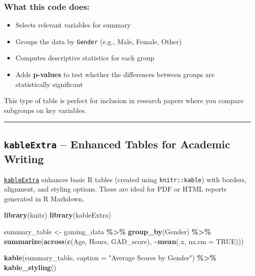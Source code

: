 \documentclass[
]{book}
\newenvironment{Shaded}{\begin{snugshade}}{\end{snugshade}}
\newcommand{\AttributeTok}[1]{\textcolor[rgb]{0.13,0.29,0.53}{#1}}
\newcommand{\ConstantTok}[1]{\textcolor[rgb]{0.56,0.35,0.01}{#1}}
\newcommand{\FunctionTok}[1]{\textcolor[rgb]{0.13,0.29,0.53}{\textbf{#1}}}
\newcommand{\NormalTok}[1]{#1}
\newcommand{\OtherTok}[1]{\textcolor[rgb]{0.56,0.35,0.01}{#1}}
\newcommand{\SpecialCharTok}[1]{\textcolor[rgb]{0.81,0.36,0.00}{\textbf{#1}}}
\newcommand{\StringTok}[1]{\textcolor[rgb]{0.31,0.60,0.02}{#1}}
\providecommand{\tightlist}{%
  \setlength{\itemsep}{0pt}\setlength{\parskip}{0pt}}
\begin{document}
\subsubsection*{What this code does:}\label{what-this-code-does-1}

\begin{itemize}
\tightlist
\item
  Selects relevant variables for summary
\item
  Groups the data by \texttt{Gender} (e.g., Male, Female, Other)
\item
  Computes descriptive statistics for each group
\item
  Adds \textbf{p-values} to test whether the differences between groups are statistically significant
\end{itemize}

This type of table is perfect for inclusion in research papers where you compare subgroups on key variables.

\begin{center}\rule{0.5\linewidth}{0.5pt}\end{center}

\subsection*{\texorpdfstring{\texttt{kableExtra} -- Enhanced Tables for Academic Writing}{kableExtra -- Enhanced Tables for Academic Writing}}\label{kableextra-enhanced-tables-for-academic-writing}

\href{https://haozhu233.github.io/kableExtra/}{\texttt{kableExtra}} enhances basic R tables (created using \texttt{knitr::kable}) with borders, alignment, and styling options. These are ideal for PDF or HTML reports generated in R Markdown.

\begin{Shaded}
\begin{Highlighting}[]
\FunctionTok{library}\NormalTok{(knitr)}
\FunctionTok{library}\NormalTok{(kableExtra)}

\NormalTok{summary\_table }\OtherTok{\textless{}{-}}\NormalTok{ gaming\_data }\SpecialCharTok{\%\textgreater{}\%}
  \FunctionTok{group\_by}\NormalTok{(Gender) }\SpecialCharTok{\%\textgreater{}\%}
  \FunctionTok{summarize}\NormalTok{(}\FunctionTok{across}\NormalTok{(}\FunctionTok{c}\NormalTok{(Age, Hours, GAD\_score), }\SpecialCharTok{\textasciitilde{}}\FunctionTok{mean}\NormalTok{(.x, }\AttributeTok{na.rm =} \ConstantTok{TRUE}\NormalTok{)))}

\FunctionTok{kable}\NormalTok{(summary\_table, }\AttributeTok{caption =} \StringTok{"Average Scores by Gender"}\NormalTok{) }\SpecialCharTok{\%\textgreater{}\%}
  \FunctionTok{kable\_styling}\NormalTok{()}
\end{Highlighting}
\end{Shaded}
\end{document}
